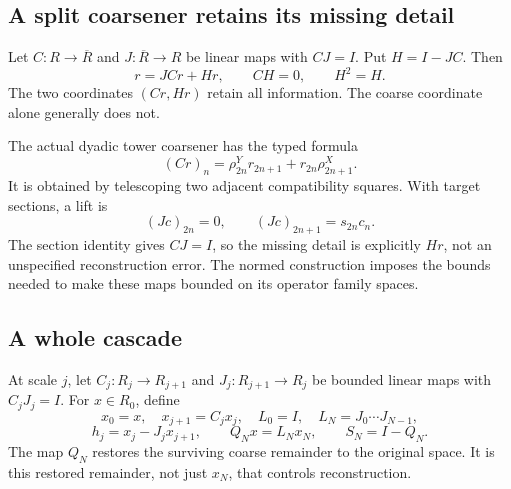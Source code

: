 

\label{sec:cascade}
\subsection{A split coarsener retains its missing detail}
Let \(C:R\to\overline R\) and \(J:\overline R\to R\) be linear maps with \(CJ=I\). Put \(H=I-JC\). Then
\[
 r=JCr+Hr,\qquad CH=0,\qquad H^2=H.
\]
The two coordinates \((Cr,Hr)\) retain all information. The coarse coordinate alone generally does not.

The actual dyadic tower coarsener has the typed formula
\begin{equation}\label{eq:dyadic}
 (Cr)_n=\rho^Y_{2n}r_{2n+1}+r_{2n}\rho^X_{2n+1}.
\end{equation}
It is obtained by telescoping two adjacent compatibility squares. With target sections, a lift is
\[
 (Jc)_{2n}=0,\qquad (Jc)_{2n+1}=s_{2n}c_n.
\]
The section identity gives \(CJ=I\), so the missing detail is explicitly \(Hr\), not an unspecified reconstruction error. The normed construction imposes the bounds needed to make these maps bounded on its operator family spaces.

\subsection{A whole cascade}
At scale \(j\), let \(C_j:R_j\to R_{j+1}\) and \(J_j:R_{j+1}\to R_j\) be bounded linear maps with \(C_jJ_j=I\). For \(x\in R_0\), define
\[
 x_0=x,\quad x_{j+1}=C_jx_j,\quad
 L_0=I,\quad L_N=J_0\cdots J_{N-1},
\]
\[
 h_j=x_j-J_jx_{j+1},\qquad Q_Nx=L_Nx_N,
 \qquad S_N=I-Q_N.
\]
The map \(Q_N\) restores the surviving coarse remainder to the original space. It is this restored remainder, not just \(x_N\), that controls reconstruction.

